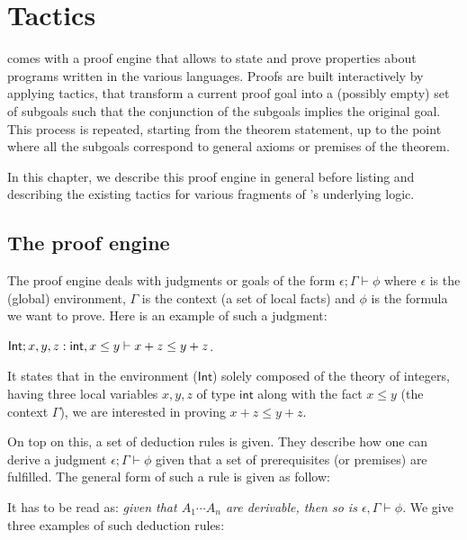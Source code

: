 \chapter{Tactics}
\label{Tactics}

\EasyCrypt comes with a proof engine that allows to state and prove properties
about programs written in the various languages.
%
Proofs are built interactively by applying tactics, that transform a
current proof goal into a (possibly empty) set of subgoals such that the
conjunction of the subgoals implies the original goal.
%
This process is repeated, starting from the theorem statement, up to the point
where all the subgoals correspond to general axioms or premises of the theorem.

In this chapter, we describe this proof engine in general before listing and
describing the existing tactics for various fragments of \EasyCrypt's
underlying logic.

\section{The proof engine}

The proof engine deals with judgments or goals of the form
$\epsilon; \Gamma \vdash \phi$ where $\epsilon$ is the (global) environment,
$\Gamma$ is the context (a set of local facts) and $\phi$ is the
formula we want to prove. Here is an example of such a judgment:

\begin{center}
$\mathsf{Int}; x, y , z: \tint, x \le y \vdash x + z \le y + z$.
\end{center}

It states that in the environment ($\mathsf{Int}$) solely composed of the
theory of integers, having three local variables $x, y, z$ of type
$\mathsf{int}$ along with the fact $x \le y$ (the context $\Gamma$), we are
interested in proving $x + z \le y + z$.

\medskip

On top on this, a set of deduction rules is given. They describe how one can
derive a judgment $\epsilon; \Gamma \vdash \phi$ given that a set of prerequisites
(or premises) are fulfilled. The general form of such a rule is given
as follow:

\begin{mathpar}
\end{mathpar}

It has to be read as: \emph{given that $A_1 \cdots A_n$ are derivable, then
so is $\epsilon, \Gamma \vdash \phi$}. We give three examples of such deduction
rules:

